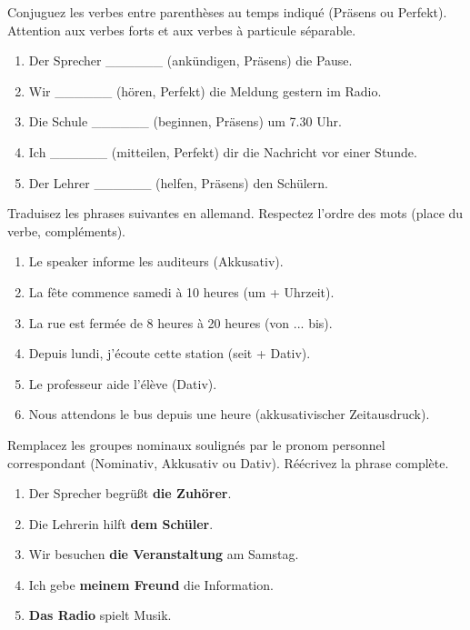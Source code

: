 \documentclass[11pt]{article}
\newcounter{popsec}
\newcounter{popsub}
\newcommand{\courssub}[1]{%
  \stepcounter{popsub}%
  \par\vspace{9pt}\noindent{\popxbold\fontsize{11.5}{13}\selectfont\color{popink}{\color{poporange}\thepopsec.\thepopsub}\hspace{6pt}#1}\par\nopagebreak\vspace{4pt}
}
\begin{document}
\begin{exercice}
Conjuguez les verbes entre parenthèses au temps indiqué (Präsens ou Perfekt). Attention aux verbes forts et aux verbes à particule séparable.
\begin{enumerate}
\item Der Sprecher \_\_\_\_\_\_ (ankündigen, Präsens) die Pause.
\item Wir \_\_\_\_\_\_ (hören, Perfekt) die Meldung gestern im Radio.
\item Die Schule \_\_\_\_\_\_ (beginnen, Präsens) um 7.30 Uhr.
\item Ich \_\_\_\_\_\_ (mitteilen, Perfekt) dir die Nachricht vor einer Stunde.
\item Der Lehrer \_\_\_\_\_\_ (helfen, Präsens) den Schülern.
\end{enumerate}
\end{exercice}

\courssub{Je m'entraîne}

\begin{exercice}
Traduisez les phrases suivantes en allemand. Respectez l'ordre des mots (place du verbe, compléments).
\begin{enumerate}
\item Le speaker informe les auditeurs (Akkusativ).
\item La fête commence samedi à 10 heures (um + Uhrzeit).
\item La rue est fermée de 8 heures à 20 heures (von ... bis).
\item Depuis lundi, j'écoute cette station (seit + Dativ).
\item Le professeur aide l'élève (Dativ).
\item Nous attendons le bus depuis une heure (akkusativischer Zeitausdruck).
\end{enumerate}
\end{exercice}

\begin{exercice}
Remplacez les groupes nominaux soulignés par le pronom personnel correspondant (Nominativ, Akkusativ ou Dativ). Réécrivez la phrase complète.
\begin{enumerate}
\item Der Sprecher begrüßt \textbf{die Zuhörer}.
\item Die Lehrerin hilft \textbf{dem Schüler}.
\item Wir besuchen \textbf{die Veranstaltung} am Samstag.
\item Ich gebe \textbf{meinem Freund} die Information.
\item \textbf{Das Radio} spielt Musik.
\end{enumerate}
\end{exercice}
\end{document}
